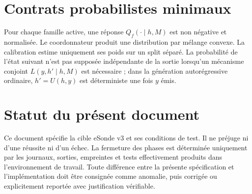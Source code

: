 \documentclass[11pt,a4paper,oneside,openany]{book}
\begin{document}
\appendix
\chapter{Contrats probabilistes minimaux}
Pour chaque famille active, une réponse $Q_f(\cdot\mid h,M)$ est non négative et normalisée. Le coordonnateur produit une distribution par mélange convexe. La calibration estime uniquement ses poids sur un split séparé. La probabilité de l'état suivant n'est pas supposée indépendante de la sortie lorsqu'un mécanisme conjoint $L(y,h'\mid h,M)$ est nécessaire ; dans la génération autorégressive ordinaire, $h'=U(h,y)$ est déterministe une fois $y$ émis.

\chapter{Statut du présent document}
Ce document spécifie la cible eSonde v3 et ses conditions de test. Il ne préjuge ni d'une réussite ni d'un échec. La fermeture des phases est déterminée uniquement par les journaux, sorties, empreintes et tests effectivement produits dans l'environnement de travail. Toute différence entre la présente spécification et l'implémentation doit être consignée comme anomalie, puis corrigée ou explicitement reportée avec justification vérifiable.
\end{document}
